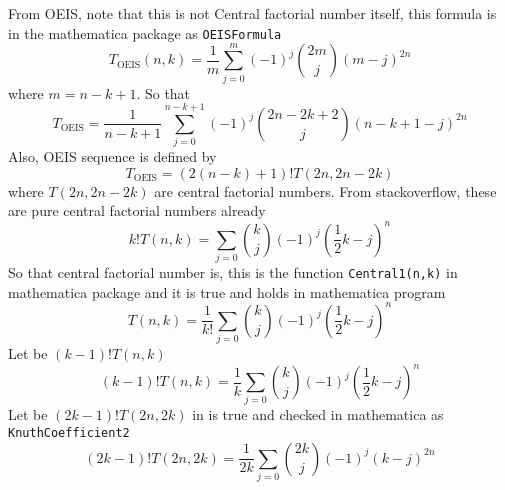 From OEIS, note that this is not Central factorial number itself, this formula is in the mathematica package as
\texttt{OEISFormula}
\begin{equation*}
    T_{\mathrm{OEIS}} (n,k) = \frac{1}{m} \sum_{j=0}^{m} (-1)^{j} \binom{2m}{j} (m-j)^{2n}
\end{equation*}
where $m=n-k+1$.
So that
\begin{equation*}
    T_{\mathrm{OEIS}} = \frac{1}{n-k+1} \sum_{j=0}^{n-k+1} (-1)^{j} \binom{2n-2k+2}{j} (n-k+1-j)^{2n}
\end{equation*}
Also, OEIS sequence is defined by
\begin{equation*}
    T_{\mathrm{OEIS}} = (2(n-k) + 1)! T(2n, 2n-2k)
\end{equation*}
where $T(2n, 2n-2k)$ are central factorial numbers.
From stackoverflow, these are pure central factorial numbers already
\begin{equation*}
    k! T(n,k) = \sum_{j=0} \binom{k}{j} (-1)^{j} \left( \frac{1}{2}k - j \right)^{n}
\end{equation*}
So that central factorial number is, this is the function \texttt{Central1(n,k)} in mathematica package
and it is true and holds in mathematica program
\begin{equation*}
    T(n,k) = \frac{1}{k!} \sum_{j=0} \binom{k}{j} (-1)^{j} \left( \frac{1}{2}k - j \right)^{n}
\end{equation*}
Let be $(k-1)! T(n,k)$
\begin{equation*}
(k-1)
    !T(n,k) = \frac{1}{k} \sum_{j=0} \binom{k}{j} (-1)^{j} \left( \frac{1}{2}k - j \right)^{n}
\end{equation*}
Let be $(2k-1)! T(2n, 2k)$ in is true and checked in mathematica as \texttt{KnuthCoefficient2}
\begin{equation*}
(2k-1)
    !T(2n, 2k) = \frac{1}{2k} \sum_{j=0} \binom{2k}{j} (-1)^{j} (k-j)^{2n}
\end{equation*}